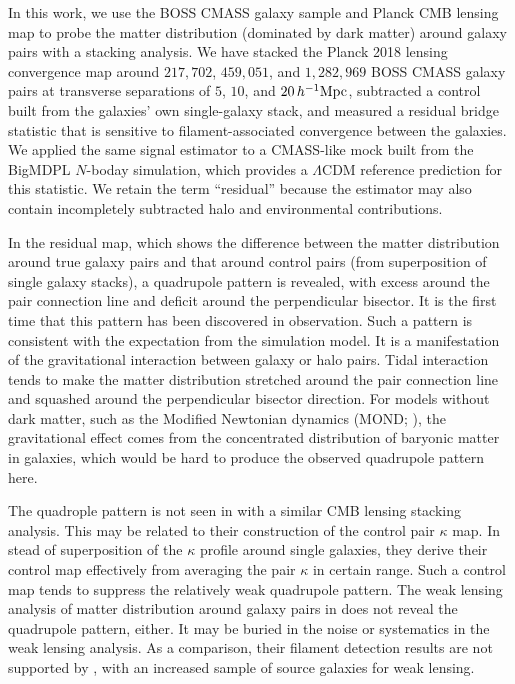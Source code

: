 \documentclass[preprint]{aastex701}
\newcommand{\hinvMpc}{h^{-1}{\rm Mpc}}
\begin{document}
In this work, we use the BOSS CMASS galaxy sample and Planck CMB lensing map to probe the matter distribution (dominated by dark matter) around galaxy pairs with a stacking analysis. We have stacked the Planck 2018 lensing convergence map around $217{,}702$,
$459{,}051$, and $1{,}282{,}969$ BOSS CMASS galaxy pairs at transverse
separations of $5$, $10$, and $20\,\hinvMpc$,
subtracted a control built from the galaxies' own single-galaxy stack, and
measured a residual bridge statistic that is sensitive to filament-associated
convergence between the galaxies. We applied the same signal estimator to a
CMASS-like mock built from the BigMDPL $N$-boday simulation, which provides a
$\Lambda$CDM reference prediction for this statistic. We retain the term
``residual'' because the estimator may also contain incompletely subtracted
halo and environmental contributions.

In the residual map, which shows the difference between the matter distribution around true galaxy pairs and that around control pairs (from superposition of single galaxy stacks), a quadrupole pattern is revealed, with excess around the pair connection line and deficit around the perpendicular bisector. It is the first time that this pattern has been discovered in observation. Such a pattern is consistent with the expectation from the simulation model. It is a manifestation of the gravitational interaction between galaxy or halo pairs. Tidal interaction tends to make the matter distribution stretched around the pair connection line and squashed around the perpendicular bisector direction. For models without dark matter, such as the Modified Newtonian dynamics (MOND; \citealt{Milgrom1983}), the gravitational effect comes from the concentrated distribution of baryonic matter in galaxies, which would be hard to produce the observed quadrupole pattern here. 

The quadrople pattern is not seen in \citet{deGraaff2019} with a similar CMB lensing stacking analysis. This may be related to their construction of the control pair $\kappa$ map. In stead of superposition of the $\kappa$ profile around single galaxies, they derive their control map effectively from averaging the pair $\kappa$ in certain range. Such a control map tends to suppress the relatively weak quadrupole pattern. The weak lensing analysis of matter distribution around galaxy pairs in \citet{EppsHudson2017} does not reveal the quadrupole pattern, either. It may be buried in the noise or systematics in the weak lensing analysis. As a comparison, their filament detection results are not supported by \citealt{Xia2020}, with an increased sample of source galaxies for weak lensing.
\end{document}
